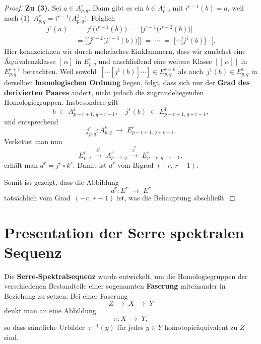 \documentclass[12pt]{article}
\numberwithin{conj}{section}
\begin{document}
\begin{proof}
    \smallskip
    \noindent
    \textbf{Zu (3).} Sei \(a \in A^r_{p,q}\). Dann gibt es ein \(b \in A^1_{p,q}\) mit \(i^{r-1}(b) = a\), weil nach (1) \(\,A^r_{p,q} = i^{r-1}\bigl(A^1_{p,q}\bigr)\). Folglich
    \begin{align}
        j^r(a)
          & \;=\;                                                     
        j^r\bigl(i^{r-1}(b)\bigr)
        \;=\;
        \bigl[j^{r-1}\bigl(i^{r-2}(b)\bigr)\bigr] \\\nonumber
          & \;= \bigl[\bigl[j^{r-2}\bigl(i^{r-3}(b)\bigr)\bigr]\bigr] 
        \;=\;
        \cdots
        \;=\;
        \bigl[\cdots \bigl[j^1(b)\bigr]\cdots\bigr].
    \end{align}
    Hier kennzeichnen wir durch mehrfaches Einklammern, dass wir zunächst eine Äquivalenzklasse \([\,\alpha]\) in \(E^r_{p,q}\) und anschließend eine weitere Klasse \([[\,\alpha]]\) in \(E^{r+1}_{p,q}\) betrachten. Weil sowohl
    \(\,[\cdots [j^1(b)] \cdots] \in E^{r+k}_{p,q}\) 
    als auch 
    \(\,j^1(b) \in E^1_{p,q}\)
    in derselben \textbf{homologischen Ordnung} liegen, folgt, dass sich nur der \textbf{Grad des derivierten Paares} ändert, nicht jedoch die zugrundeliegenden Homologiegruppen. Insbesondere gilt
    \[
        b \;\in\; A^1_{p-r+1,\,q+r-1},
        \quad
        j^1(b) \;\in\; E^1_{p-r+1,\,q+r-1},
    \]
    und entsprechend
    \[
        j^r_{p,q} : A^r_{p,q} \;\longrightarrow\; E^r_{p-r+1,\,q+r-1}.
    \]
    Verkettet man nun
    \[
        E^r_{p,q} \;\xrightarrow{k^r}\; A^r_{p-1,q}
        \;\xrightarrow{j^r}\; E^r_{p-r,\,q+r-1},
    \]
    erhält man \(d^r = j^r \circ k^r\). Damit ist \(d^r\) vom Bigrad \((-r,\,r-1)\).
    
    \bigskip
    
    \noindent
    Somit ist gezeigt, dass die Abbildung
    \[
        d^r : E^r \;\longrightarrow\; E^r
    \]
    tatsächlich vom Grad \(\,(-r,\,r-1)\) ist, was die Behauptung abschließt.
\end{proof}

\section{Presentation der Serre spektralen Sequenz}
Die \textbf{Serre-Spektralsequenz} wurde entwickelt, um die Homologiegruppen der verschiedenen Bestandteile einer sogenannten \textbf{Faserung} miteinander in Beziehung zu setzen. Bei einer Faserung 
\[
    Z \;\longrightarrow\; X \;\longrightarrow\; Y
\]
denkt man an eine Abbildung 
\[
    \pi : X \;\longrightarrow\; Y,
\]
so dass sämtliche Urbilder \(\,\pi^{-1}(y)\) für jedes \(y \in Y\) homotopieäquivalent zu \(Z\) sind. 
\end{document}
